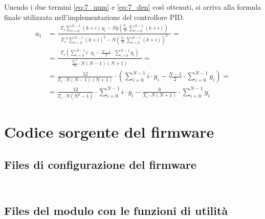 Unendo i due termini \eqref{eq:7_num} e \eqref{eq:7_den} così ottenuti, si arriva alla formula finale utilizzata
nell'implementazione del controllore PID.
\begin{align}
	a_1 &= \frac{\displaystyle \;\; T_s \sum_{i=0}^{N-1} (k + i) \, y_i - N \bar{y} \left(\frac{T_s}{N} \, \sum_{i=0}^{N-1} (k + i)\right) \;\;}{\displaystyle \;\; {T_s}^2 \sum_{i=0}^{N-1} (k + i)^2 - N \left(\frac{T_s}{N} \,\sum_{i=0}^{N-1} (k + i)\right)^2 \;\;} = \\[5pt]
	&= \frac{\displaystyle \;\; T_s \left( \sum_{i=0}^{N-1} i \cdot y_i - \frac{N-1}{2} \cdot \sum_{i=0}^{N-1} y_i \right) \;\;}{\displaystyle \;\; \frac{{T_s}^2}{12} \cdot N (N-1)(N+1) \;\;} = \\[5pt]
	&= \frac{12}{T_s \cdot N(N-1)(N+1)} \cdot \left( \sum_{i=0}^{N-1} i \cdot y_i - \frac{N-1}{2} \cdot \sum_{i=0}^{N-1} y_i \right) = \\
	&= \frac{12}{T_s \cdot N(N^2-1)} \cdot \sum_{i=0}^{N-1} i \cdot y_i - \frac{6}{T_s \cdot N(N+1)} \cdot \sum_{i=0}^{N-1} y_i
\end{align}

\chapter{Codice sorgente del firmware}
\section{Files di configurazione del firmware}

\label{lst:config_h}
\inputminted{c++}{../programmi/firmware/lib/config/config.h}

\label{lst:config_cpp}
\inputminted{c++}{../programmi/firmware/lib/config/config.cpp}

\newpage

\section{Files del modulo con le funzioni di utilità}
\label{lst:utils_h}
\inputminted{c++}{../programmi/firmware/lib/utils/utils.h}

\label{lst:utils_cpp}
\inputminted{c++}{../programmi/firmware/lib/utils/utils.cpp}

